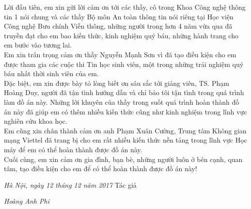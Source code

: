 \pagestyle{plain}
Lời đầu tiên, em xin gửi lời cảm ơn tới các thầy, cô trong Khoa Công nghệ thông tin 1 nói chung và các thầy Bộ môn An toàn thông tin nói riêng tại Học viện Công nghệ Bưu chính Viễn thông, những người trong hơn 4 năm vừa qua đã truyền đạt cho em bao kiến thức, kinh nghiệm quý báu, những hành trang cho em bước vào tương lai.\\

\indent Em xin trân trọng cảm ơn thầy Nguyễn Mạnh Sơn vì đã tạo điều kiện cho em được tham gia các cuộc thi Tin học sinh viên, một trong những trải nghiệm quý báu nhất thời sinh viên của em.\\

 \indent Đặc biệt, em xin được bày tỏ lòng biết ơn sâu sắc tới giảng viên, TS. Phạm Hoàng Duy, người đã tận tình hướng dẫn và chỉ bảo tôi tận tình trong quá trình làm đồ án này. Những lời khuyên của thầy trong suốt quá trình hoàn thành đồ án này đã giúp em có thêm nhiều kiến thức cũng như kinh nghiệm trong lĩnh vực nghiên cứu khoa học.\\
 
\indent Em cũng xin chân thành cảm ơn anh Phạm Xuân Cường, Trung tâm Không gian mạng Viettel đã trang bị cho em rất nhiều kiến thức nền tảng trong lĩnh vực Học máy để em có thể hoàn thành được đồ án này.\\

\indent Cuối cùng, em xin cảm ơn gia đình, bạn bè, những người luôn ở bên cạnh, quan tâm, tạo điều kiện cho em để có thể hoàn thành được đồ án này!
\begin{flushright}
\begin{minipage}{0.5\textwidth}
\centering
{\it Hà Nội, ngày 12 tháng 12 năm 2017}\n
Tác giả\n
\vspace{2cm}

{\it Hoàng Anh Phi}

\end{minipage}
\end{flushright}
